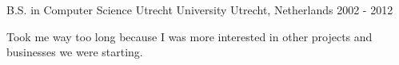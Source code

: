 

\begin{cventries}

  \cventry
    {B.S. in Computer Science} %
    {Utrecht University} %
    {Utrecht, Netherlands} %
    {2002 - 2012} %
    {
      \begin{cvitems} %
        \item {Took me way too long because I was more interested in other projects and businesses we were starting.}
      \end{cvitems}
    }

\end{cventries}
